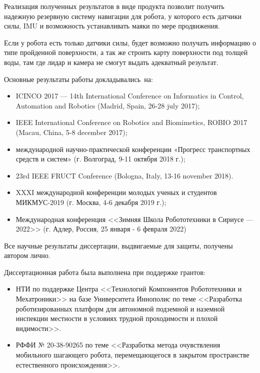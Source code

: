 {\influence} Реализация полученных результатов в виде продукта позволит получить надежную резервную систему навигации для робота, у которого есть датчики силы, IMU и возможность устанавливать маяки по мере продвижения.

Если у робота есть только датчики силы, будет возможно получать информацию о типе пройденной поверхности, а так же строить карту поверхности под толщей воды, там где лидар и камера не смогут выдать адекватный результат.


{\probation}
Основные результаты работы докладывались~на:
\begin{itemize}
  \item ICINCO 2017 --- 14th International Conference on Informatics in Control, Automation and Robotics (Madrid, Spain, 26-28 july 2017);
  \item IEEE International Conference on Robotics and Biomimetics, ROBIO 2017 (Macau, China, 5-8 december 2017);
  \item  международной  научно-практической  конференции  «Прогресс  транспортных 
  средств и систем» (г. Волгоград, 9-11 октября 2018 г.);
  \item 23rd IEEE FRUCT Conference (Bologna, Italy, 13-16 november 2018).
  \item XXXI международной конференции молодых ученых и студентов МИКМУС-2019 
  (г. Москва, 4-6 декабря 2019 г.);
  \item Международная конференция <<Зимняя Школа Робототехники в Сириусе --- 2022>> (г. Адлер, Россия, 25 января - 6 февраля 2022)
\end{itemize}

{\contribution} Все научные результаты диссертации, выдвигаемые для защиты, получены автором лично.



Диссертационная работа была выполнена при поддержке грантов:
\begin{itemize}
    \item НТИ по поддержке Центра <<Технологий Компонентов Робототехники и Мехатроники>> на базе Университета Иннополис по теме <<Разработка роботизированных платформ для автономной подземной и наземной инспекции местности в условиях трудной проходимости и плохой видимости>>. 
    \item РФФИ № 20-38-90265 по теме <<Разработка метода очувствления мобильного шагающего робота, перемещающегося в закрытом пространстве естественного происхождения>>.
\end{itemize}

